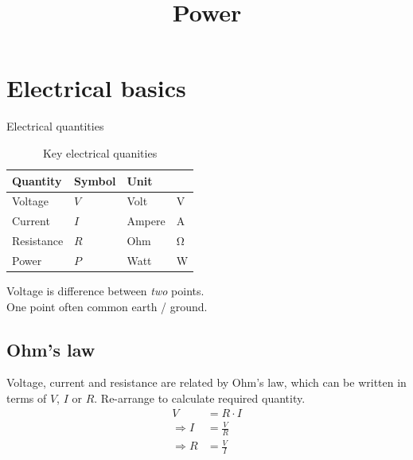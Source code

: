 \documentclass{pgslides}
\title{Power}
\begin{document}
\maketitle

\section{Electrical basics}

\begin{frame}{Electrical quantities}
\begin{table}[htbp]
  \centering
  \begin{tabular}{l l l l}
    \toprule
    \textbf{Quantity} & \textbf{Symbol} & \textbf{Unit} & ~ \\
    \midrule
    Voltage & $V$ & Volt & \si{\volt} \\
    Current & $I$ & Ampere & \si{\ampere} \\
    Resistance & $R$ & Ohm & \si{\ohm} \\
    Power & $P$ & Watt & \si{\watt} \\
    \bottomrule
  \end{tabular}
  \caption{Key electrical quanities}
  \label{tab:key-electrical-quantities}
\end{table}

Voltage is difference between \textit{two} points.\\
One point often common earth / ground.
\end{frame}

\subsection{Ohm's law}

\begin{frame}{\insertsubsectionhead}
Voltage, current and resistance are related by Ohm's law, which can be written in terms of $V$, $I$ or $R$.
Re-arrange to calculate required quantity.
\begin{align}
  V & = R \cdot I \\
  \Rightarrow I & = \frac{V}{R} \\
  \Rightarrow R & = \frac{V}{I}      
\end{align}
\end{frame}

\end{document}
